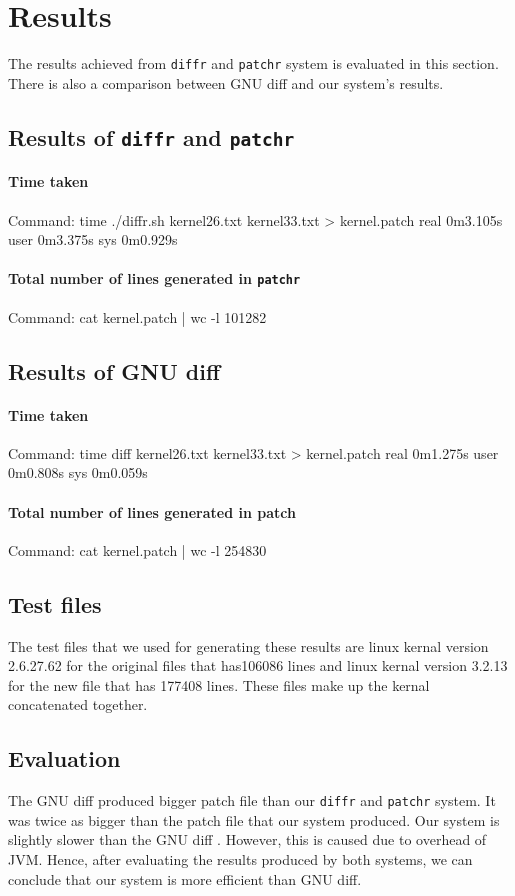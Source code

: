 \section{Results}

The results achieved from \texttt{diffr} and \texttt{patchr} system is evaluated in this section. There is also a comparison between GNU diff and our system's results. 

\subsection{Results of \texttt{diffr} and \texttt{patchr} }
\paragraph{Time taken}
Command: time ./diffr.sh kernel26.txt kernel33.txt > kernel.patch
real	0m3.105s
user	0m3.375s
sys	0m0.929s
\paragraph{Total number of lines generated in \texttt{patchr}}
Command: cat kernel.patch | wc -l
101282
  
\subsection{Results of GNU diff }
\paragraph{Time taken}
Command: time diff kernel26.txt kernel33.txt > kernel.patch
real	0m1.275s
user	0m0.808s
sys	0m0.059s
\paragraph{Total number of lines generated in patch}
Command: cat kernel.patch | wc -l
254830
  
\subsection{Test files}
The test files that we used for generating these results are linux kernal version 2.6.27.62 for the original files that has106086 lines and linux kernal version 3.2.13 for the new file that has 177408 lines. These files make up the kernal concatenated together. 

\subsection{Evaluation}
The GNU diff produced bigger patch file than our \texttt{diffr} and \texttt{patchr} system. It was twice as bigger than the patch file that our system produced. Our system is slightly slower than the GNU diff . However, this is caused due to overhead of JVM. Hence, after evaluating the results produced by both systems, we can conclude that our system is more efficient than GNU diff.


